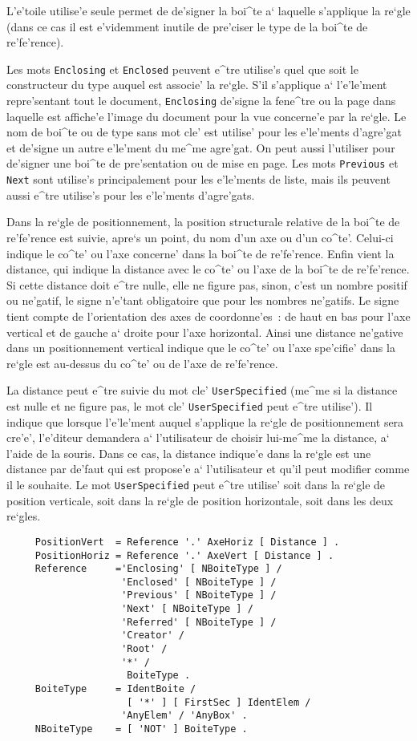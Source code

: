 {L'e'toile {\tt *} utilise'e seule permet de de'signer la boi^te
a` laquelle s'applique la re`gle (dans ce cas il est e'videmment inutile de
pre'ciser le type de la boi^te de re'fe'rence).

Les mots {\tt Enclosing} et {\tt Enclosed} peuvent e^tre utilise's quel
que soit le constructeur du type auquel est associe' la re`gle.
S'il s'applique a` l'e'le'ment repre'sentant tout le document,
{\tt Enclosing} de'signe la fene^tre ou la page
dans laquelle est affiche'e l'image du document pour la vue concerne'e
par la re`gle. Le nom de boi^te ou de type sans mot cle'
est utilise' pour les e'le'ments d'agre'gat et de'signe un autre e'le'ment du
me^me agre'gat. On peut aussi l'utiliser pour de'signer une boi^te de
pre'sentation ou de mise en page.
Les mots {\tt Previous} et {\tt Next} sont utilise's principalement pour les
e'le'ments de liste, mais ils peuvent aussi e^tre utilise's pour les e'le'ments
d'agre'gats.

Dans la re`gle de positionnement, la position structurale relative de la
boi^te de re'fe'rence est suivie, apre`s un point, du nom d'un axe ou d'un
co^te'.
Celui-ci indique le co^te' ou l'axe concerne' dans la boi^te de re'fe'rence.
Enfin vient la distance, qui indique la distance avec le co^te' ou l'axe
de la boi^te de re'fe'rence. Si cette distance doit e^tre nulle, elle
ne figure pas, sinon, c'est un nombre positif ou ne'gatif, le signe
n'e'tant obligatoire que pour les nombres ne'gatifs. Le signe tient compte
de l'orientation des axes de coordonne'es~: de haut en bas pour l'axe vertical
et de gauche a` droite pour l'axe horizontal. Ainsi une distance ne'gative
dans un positionnement vertical indique que le co^te' ou l'axe spe'cifie'
dans la re`gle est au-dessus du co^te' ou de l'axe de re'fe'rence.

La distance peut e^tre suivie du mot cle' {\tt UserSpecified} (me^me si
la distance est nulle et ne figure pas, le mot cle' {\tt UserSpecified}
peut e^tre utilise'). Il indique que lorsque l'e'le'ment auquel s'applique
la re`gle de positionnement sera cre'e', l'e'diteur demandera a` l'utilisateur
de choisir lui-me^me la distance, a` l'aide de la souris. Dans ce cas, la
distance indique'e dans la re`gle est une distance par de'faut qui est
propose'e a` l'utilisateur et qu'il peut modifier comme il le souhaite.
Le mot {\tt UserSpecified} peut e^tre utilise' soit dans la re`gle de position
verticale, soit dans la re`gle de position horizontale, soit dans les deux
re`gles.

\begin{verbatim}
     PositionVert  = Reference '.' AxeHoriz [ Distance ] .
     PositionHoriz = Reference '.' AxeVert [ Distance ] .
     Reference     ='Enclosing' [ NBoiteType ] /
                    'Enclosed' [ NBoiteType ] /
                    'Previous' [ NBoiteType ] /
                    'Next' [ NBoiteType ] /
                    'Referred' [ NBoiteType ] /
                    'Creator' /
                    'Root' /
                    '*' /
                     BoiteType .
     BoiteType     = IdentBoite /
                     [ '*' ] [ FirstSec ] IdentElem /
                    'AnyElem' / 'AnyBox' .
     NBoiteType    = [ 'NOT' ] BoiteType .
\end{verbatim}

}
